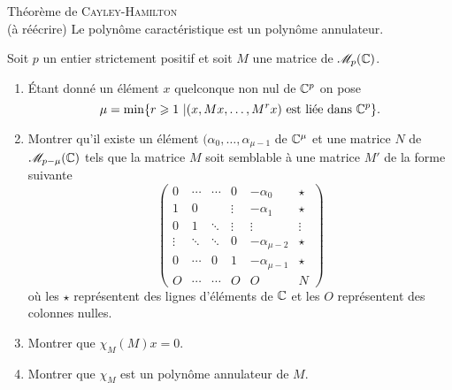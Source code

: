 \begin{preuve}
    
\end{preuve}

\begin{theo}
    Théorème de \textsc{Cayley}-\textsc{Hamilton} \\
    (à réécrire) Le polynôme caractéristique est un polynôme annulateur.
\end{theo}


\begin{exercice}
    Soit $p$ un entier strictement positif et soit $M$ une matrice de $\mathscr{M}_p(\mathbb{C})$.
    \begin{enumerate}
        \item Étant donné un élément $x$ quelconque non nul de $\mathbb{C}^p$ on pose
        $$\mu = \min \{ r \geqslant 1\ | (x, Mx, \dots, M^r x) \text{ est liée dans } \mathbb{C}^p\}.$$
        \item Montrer qu'il existe un élément $(\alpha_0, \dots, \alpha_{\mu-1}$ de $\mathbb{C}^{\mu}$ et une matrice $N$ de $\mathscr{M}_{p-\mu}(\mathbb{C})$ tels que la matrice $M$ soit semblable à une matrice $M'$ de la forme suivante
        $$
        \begin{pmatrix}
        0 & \cdots & \cdots & 0 & -\alpha_0 & \star \\
        1 & 0 & & \vdots & -\alpha_1 & \star \\
        0 & 1 & \ddots & \vdots & \vdots & \vdots \\
        \vdots & \ddots & \ddots & 0 & -\alpha_{\mu-2} & \star \\
        0 & \cdots & 0 & 1 & -\alpha_{\mu-1} & \star \\
        O & \cdots & \cdots & O & O & N
        \end{pmatrix}
        $$
        où les $\star$ représentent des lignes d'éléments de $\mathbb{C}$ et les $O$ représentent des colonnes nulles. 
        \item Montrer que $\chi_M(M)x = 0$.
        \item Montrer que $\chi_M$ est un polynôme annulateur de $M$.
    \end{enumerate}
\end{exercice}

